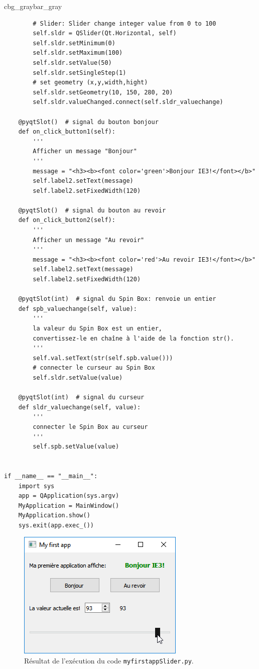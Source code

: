 \documentclass[%
oneside,                 %
final,                   %
10pt,french]{article}
\newenvironment{_pro_tight}[2]{
   \def\FrameCommand{\color{#2}\vrule width 1mm\normalcolor\colorbox{#1}}
   \FrameRule0.6pt\MakeFramed {\advance\hsize-2mm\FrameRestore}\vskip3mm}
   {\vskip0mm\endMakeFramed}
\newenvironment{pro}[2]{
\bgroup\rmfamily
\fboxsep=0mm\relax
\begin{_pro_tight}{#1}{#2}
\list{}{\parsep=-2mm\parskip=0mm\topsep=0pt\leftmargin=2mm
\rightmargin=2\leftmargin\leftmargin=4pt\relax}
\item\relax}
{\endlist\end{_pro_tight}\egroup}
\begin{document}
\begin{pro}{cbg_gray}{bar_gray}
\begin{verbatim}
        # Slider: Slider change integer value from 0 to 100
        self.sldr = QSlider(Qt.Horizontal, self)
        self.sldr.setMinimum(0)
        self.sldr.setMaximum(100)
        self.sldr.setValue(50)
        self.sldr.setSingleStep(1)
        # set geometry (x,y,width,hight)
        self.sldr.setGeometry(10, 150, 280, 20)
        self.sldr.valueChanged.connect(self.sldr_valuechange)

    @pyqtSlot()  # signal du bouton bonjour
    def on_click_button1(self):
        '''
        Afficher un message "Bonjour"
        '''
        message = "<h3><b><font color='green'>Bonjour IE3!</font></b>"
        self.label2.setText(message)
        self.label2.setFixedWidth(120)

    @pyqtSlot()  # signal du bouton au revoir
    def on_click_button2(self):
        '''
        Afficher un message "Au revoir"
        '''
        message = "<h3><b><font color='red'>Au revoir IE3!</font></b>"
        self.label2.setText(message)
        self.label2.setFixedWidth(120)

    @pyqtSlot(int)  # signal du Spin Box: renvoie un entier
    def spb_valuechange(self, value):
        '''
        la valeur du Spin Box est un entier,
        convertissez-le en chaîne à l'aide de la fonction str().
        '''
        self.val.setText(str(self.spb.value()))
        # connecter le curseur au Spin Box
        self.sldr.setValue(value)

    @pyqtSlot(int)  # signal du curseur
    def sldr_valuechange(self, value):
        '''
        connecter le Spin Box au curseur
        '''
        self.spb.setValue(value)


if __name__ == "__main__":
    import sys
    app = QApplication(sys.argv)
    MyApplication = MainWindow()
    MyApplication.show()
    sys.exit(app.exec_())
\end{verbatim}
\end{pro}
\noindent


\begin{figure}[!ht]  %
  \centerline{\includegraphics[width=0.7\linewidth]{imgs/myfirstappSlider2.png}}
  \caption{
  Résultat de l'exécution du code \texttt{myfirstappSlider.py}. \label{fig:myfirstappSlider}
  }
\end{figure}
\end{document}
